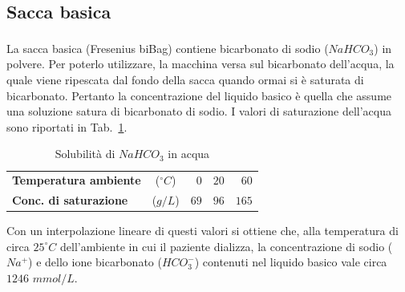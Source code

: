 \subsection{Sacca basica}
La sacca basica (Fresenius biBag\textsuperscript\textregistered) contiene bicarbonato di sodio ($NaHCO_3$) in polvere. Per poterlo utilizzare, la macchina versa sul bicarbonato dell'acqua, la quale viene ripescata dal fondo della sacca quando ormai si è saturata di bicarbonato. Pertanto la concentrazione del liquido basico è quella che assume una soluzione satura di bicarbonato di sodio. I valori di saturazione dell'acqua sono riportati in Tab.~\ref{tab:basica}.
\begin{table}[htb]
	\centering
	\caption{Solubilità di $NaHCO_3$ in acqua}
	\begin{tabular}{lcrrr}
	\toprule 
		\textbf{Temperatura ambiente} & ($^\circ C$) & $0$  & $20$ & $60$  \\
		\textbf{Conc. di saturazione} & ($g/L$)      & $69$ & $96$ & $165$ \\
  \bottomrule
\end{tabular}\label{tab:basica}
\end{table}
Con un interpolazione lineare di questi valori si ottiene che, alla temperatura di circa $25^\circ C$ dell'ambiente in cui il paziente dializza, la concentrazione di sodio ($Na^+$) e dello ione bicarbonato ($HCO_3^-$) contenuti nel liquido basico vale circa $1246$ $mmol/L$.


